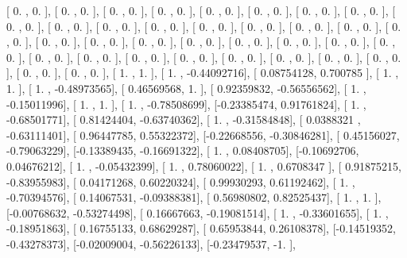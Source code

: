 \documentclass{article}
\begin{document}
       [ 0.        ,  0.        ],
       [ 0.        ,  0.        ],
       [ 0.        ,  0.        ],
       [ 0.        ,  0.        ],
       [ 0.        ,  0.        ],
       [ 0.        ,  0.        ],
       [ 0.        ,  0.        ],
       [ 0.        ,  0.        ],
       [ 0.        ,  0.        ],
       [ 0.        ,  0.        ],
       [ 0.        ,  0.        ],
       [ 0.        ,  0.        ],
       [ 0.        ,  0.        ],
       [ 0.        ,  0.        ],
       [ 0.        ,  0.        ],
       [ 0.        ,  0.        ],
       [ 0.        ,  0.        ],
       [ 0.        ,  0.        ],
       [ 0.        ,  0.        ],
       [ 0.        ,  0.        ],
       [ 0.        ,  0.        ],
       [ 0.        ,  0.        ],
       [ 0.        ,  0.        ],
       [ 0.        ,  0.        ],
       [ 0.        ,  0.        ],
       [ 0.        ,  0.        ],
       [ 0.        ,  0.        ],
       [ 0.        ,  0.        ],
       [ 0.        ,  0.        ],
       [ 0.        ,  0.        ],
       [ 0.        ,  0.        ],
       [ 0.        ,  0.        ],
       [ 0.        ,  0.        ],
       [ 0.        ,  0.        ],
       [ 0.        ,  0.        ],
       [ 1.        ,  1.        ],
       [ 1.        , -0.44092716],
       [ 0.08754128,  0.700785  ],
       [ 1.        ,  1.        ],
       [ 1.        , -0.48973565],
       [ 0.46569568,  1.        ],
       [ 0.92359832, -0.56556562],
       [ 1.        , -0.15011996],
       [ 1.        ,  1.        ],
       [ 1.        , -0.78508699],
       [-0.23385474,  0.91761824],
       [ 1.        , -0.68501771],
       [ 0.81424404, -0.63740362],
       [ 1.        , -0.31584848],
       [ 0.0388321 , -0.63111401],
       [ 0.96447785,  0.55322372],
       [-0.22668556, -0.30846281],
       [ 0.45156027, -0.79063229],
       [-0.13389435, -0.16691322],
       [ 1.        ,  0.08408705],
       [-0.10692706,  0.04676212],
       [ 1.        , -0.05432399],
       [ 1.        ,  0.78060022],
       [ 1.        ,  0.6708347 ],
       [ 0.91875215, -0.83955983],
       [ 0.04171268,  0.60220324],
       [ 0.99930293,  0.61192462],
       [ 1.        , -0.70394576],
       [ 0.14067531, -0.09388381],
       [ 0.56980802,  0.82525437],
       [ 1.        ,  1.        ],
       [-0.00768632, -0.53274498],
       [ 0.16667663, -0.19081514],
       [ 1.        , -0.33601655],
       [ 1.        , -0.18951863],
       [ 0.16755133,  0.68629287],
       [ 0.65953844,  0.26108378],
       [-0.14519352, -0.43278373],
       [-0.02009004, -0.56226133],
       [-0.23479537, -1.        ],
\end{document}
